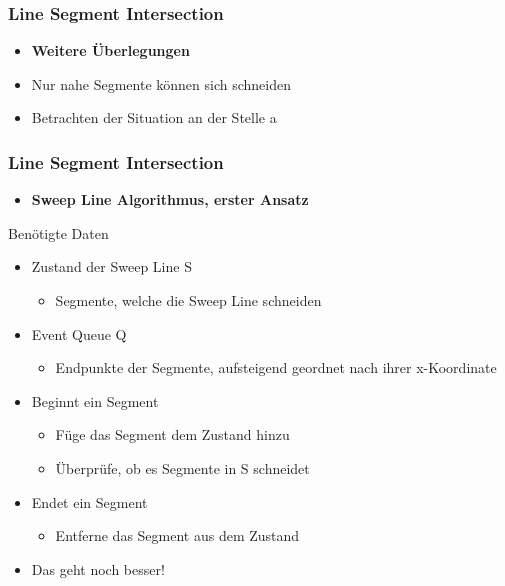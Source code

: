\begin{frame}
	\frametitle{{Line Segment Intersection}}
	\begin{itemize}
		\item \textbf{Weitere \"Uberlegungen}
		\pause
		\item{Nur nahe Segmente k\"onnen sich schneiden}
		\pause
		\item{Betrachten der Situation an der Stelle a}
	\end{itemize}
\end{frame}
\begin{frame}
	\frametitle{{Line Segment Intersection}}
	\begin{itemize}
		\item \textbf{Sweep Line Algorithmus, erster Ansatz}
		\pause
	\end{itemize}
	\begin{block}{Ben\"otigte Daten}
		\begin{itemize}
			\item Zustand der Sweep Line S
			\begin{itemize}
				\item Segmente, welche die Sweep Line schneiden
			\end{itemize}
			\pause
			\item Event Queue Q
			\begin{itemize}
				\item Endpunkte der Segmente, aufsteigend geordnet nach ihrer x-Koordinate
			\end{itemize}
		\end{itemize}
	\end{block}
	\begin{itemize}
		\pause
		\item Beginnt ein Segment
		\begin{itemize}
			\pause		
			\item F\"uge das Segment dem Zustand hinzu
			\pause
			\item \"Uberpr\"ufe, ob es Segmente in S schneidet
		\end{itemize}
		\pause
		\item Endet ein Segment
		\begin{itemize}
			\pause
			\item Entferne das Segment aus dem Zustand
		\end{itemize}
		\pause
		\item Das geht noch besser!
	\end{itemize}
\end{frame}
